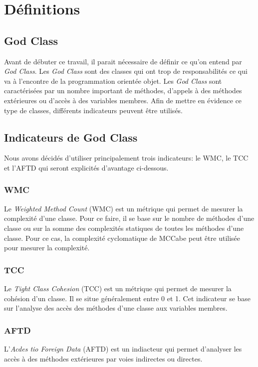 \documentclass[11pt]{report}
\begin{document}


\tableofcontents


\chapter{Définitions}

	\section{God Class}
	Avant de débuter ce travail, il parait nécessaire de définir ce qu'on entend par \textit{God Class}. Les \textit{God Class} sont des classes qui ont trop de responsabilités ce qui va à l'encontre de la programmation orientée objet. Les \textit{God Class} sont caractérisées par un nombre important de méthodes, d'appels à des méthodes extérieures ou d'accès à des variables membres. Afin de mettre en évidence ce type de classes, différents indicateurs peuvent être utilisés. 
	
	\section{Indicateurs de God Class}
	Nous avons décidés d'utiliser principalement trois indicateurs: le WMC, le TCC et l'AFTD qui seront explicités d'avantage ci-dessous.   
		
		\subsection{WMC}
		Le \textit{Weighted Method Count} (WMC) est un métrique qui permet de mesurer la complexité d'une classe. Pour ce faire, il se base sur le nombre de méthodes d'une classe ou sur la somme des complexités statiques de toutes les méthodes d'une classe. Pour ce cas, la complexité cyclomatique de MCCabe peut être utilisée pour mesurer la complexité.  
		
		\subsection{TCC}
		Le \textit{Tight Class Cohesion} (TCC) est un métrique qui permet de mesurer la cohésion d'un classe. Il se situe généralement entre 0 et 1. Cet indicateur se base sur l'analyse des accès des méthodes d'une classe aux variables membres.  
		
		\subsection{AFTD}
		L'\textit{Acdes tio Foreign Data} (AFTD) est un indiacteur qui permet d'analyser les accès à des méthodes extérieures par voies indirectes ou directes. 
	
\end{document}
